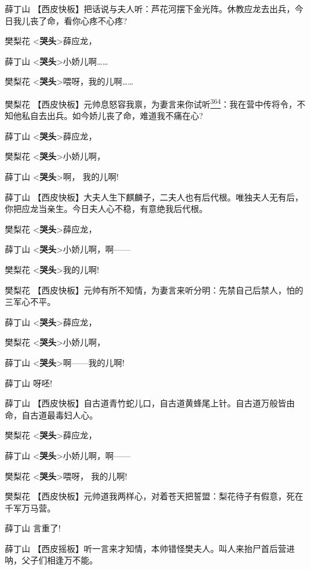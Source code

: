 薛丁山
【西皮快板】把话说与夫人听：芦花河摆下金光阵。休教应龙去出兵，今日我儿丧了命，看你心疼不心疼?

樊梨花 \textless{}\textbf{哭头}\textgreater{}薛应龙，

薛丁山 \textless{}\textbf{哭头}\textgreater{}小娇儿啊\ldots{}\ldots{}

樊梨花
\textless{}\textbf{哭头}\textgreater{}喂呀，我的儿啊\ldots{}\ldots{}

樊梨花
【西皮快板】元帅息怒容我禀，为妻言来你试听\protect\hyperlink{fn364}{\textsuperscript{364}}：我在营中传将令，不知他私自去出兵。如今娇儿丧了命，难道我不痛在心?

薛丁山 \textless{}\textbf{哭头}\textgreater{}薛应龙，

樊梨花 \textless{}\textbf{哭头}\textgreater{}小娇儿啊，

薛丁山 \textless{}\textbf{哭头}\textgreater{}啊， 我的儿啊!

薛丁山
【西皮快板】大夫人生下麒麟子，二夫人也有后代根。唯独夫人无有后，你把应龙当亲生。今日夫人心不稳，有意绝我后代根。

樊梨花 \textless{}\textbf{哭头}\textgreater{}薛应龙，

薛丁山 \textless{}\textbf{哭头}\textgreater{}小娇儿啊，啊------

樊梨花 \textless{}\textbf{哭头}\textgreater{}我的儿啊!

樊梨花
【西皮快板】元帅有所不知情，为妻言来听分明：先禁自己后禁人，怕的三军心不平。

薛丁山 \textless{}\textbf{哭头}\textgreater{}薛应龙，

樊梨花 \textless{}\textbf{哭头}\textgreater{}小娇儿啊，

薛丁山 \textless{}\textbf{哭头}\textgreater{}啊------我的儿啊!

薛丁山 呀呸!

薛丁山
【西皮快板】自古道青竹蛇儿口，自古道黄蜂尾上针。自古道万般皆由命，自古道最毒妇人心。

樊梨花 \textless{}\textbf{哭头}\textgreater{}薛应龙，

薛丁山 \textless{}\textbf{哭头}\textgreater{}小娇儿啊，啊------

樊梨花 \textless{}\textbf{哭头}\textgreater{}喂呀， 我的儿啊!

樊梨花
【西皮快板】元帅道我两样心，对着苍天把誓盟：梨花待子有假意，死在千军万马营。

薛丁山 言重了!

薛丁山
【西皮摇板】听一言来才知情，本帅错怪樊夫人。叫人来抬尸首后营进呐，父子们相逢万不能。

